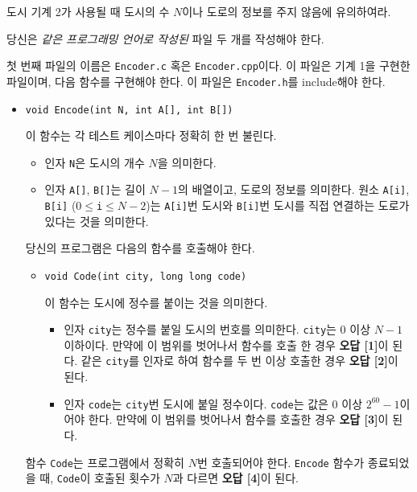 \begin{problem}{도시}
	기계 2가 사용될 때 도시의 수 $N$이나 도로의 정보를 주지 않음에 유의하여라.
	
	\Specification
	
	당신은 \textit{같은 프로그래밍 언어로 작성된} 파일 두 개를 작성해야 한다.
	
	첫 번째 파일의 이름은 \texttt{Encoder.c} 혹은 \texttt{Encoder.cpp}이다. 이 파일은 기계 1을 구현한 파일이며, 다음 함수를 구현해야 한다. 이 파일은 \texttt{Encoder.h}를 include해야 한다.
	
	\begin{itemize}
		\item \texttt{void Encode(int N, int A[], int B[])}
		
		이 함수는 각 테스트 케이스마다 정확히 한 번 불린다.
		\begin{itemize}
			\item 인자 \texttt{N}은 도시의 개수 $N$을 의미한다.
			\item 인자 \texttt{A[]}, \texttt{B[]}는 길이 $N-1$의 배열이고, 도로의 정보를 의미한다. 원소 \texttt{A[i]}, \texttt{B[i]} ($0 \le $\texttt{i}$\le N-2$)는 \texttt{A[i]}번 도시와 \texttt{B[i]}번 도시를 직접 연결하는 도로가 있다는 것을 의미한다.
		\end{itemize}
		
		당신의 프로그램은 다음의 함수를 호출해야 한다.
		\begin{itemize}
			\item \texttt{void Code(int city, long long code)}
			
			이 함수는 도시에 정수를 붙이는 것을 의미한다.
			
			\begin{itemize}
				\item 인자 \texttt{city}는 정수를 붙일 도시의 번호를 의미한다. \texttt{city}는 0 이상 $N-1$ 이하이다. 만약에 이 범위를 벗어나서 함수를 호출 한 경우 \textbf{오답 [1]}이 된다. 같은 \texttt{city}를 인자로 하여 함수를 두 번 이상 호출한 경우 \textbf{오답 [2]}이 된다.
				\item 인자 \texttt{code}는 \texttt{city}번 도시에 붙일 정수이다. \texttt{code}는 값은 0 이상 $2^{60}-1$이어야 한다. 만약에 이 범위를 벗어나서 함수를 호출한 경우 \textbf{오답 [3]}이 된다.
			\end{itemize}
			
		\end{itemize}
		
		함수 \texttt{Code}는 프로그램에서 정확히 $N$번 호출되어야 한다. \texttt{Encode} 함수가 종료되었을 때, \texttt{Code}이 호출된 횟수가 $N$과 다르면 \textbf{오답 [4]}이 된다.
		

\end{itemize}
\end{problem}

